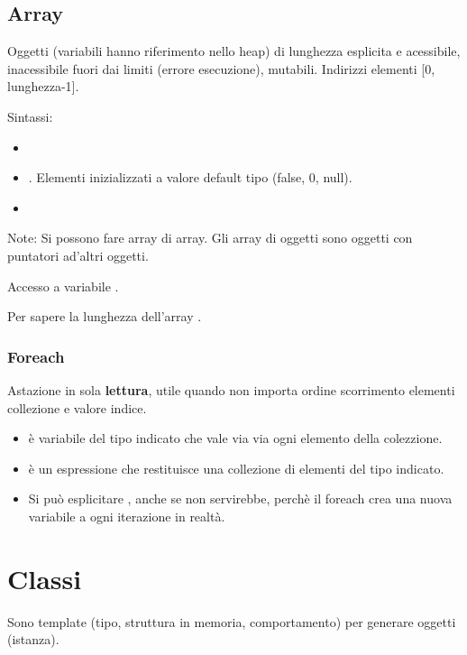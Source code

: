\subsection{Array}
Oggetti (variabili hanno riferimento nello heap) di lunghezza esplicita e acessibile, inacessibile fuori dai limiti (errore esecuzione), mutabili. Indirizzi elementi [0, lunghezza-1].

Sintassi:
\begin{itemize}
	\item {}
	\item {}. Elementi inizializzati a valore default tipo (false, 0, null).
	\item {}
\end{itemize}

Note: Si possono fare array di array. Gli array di oggetti sono oggetti con puntatori ad'altri oggetti.

Accesso a variabile .

Per sapere la lunghezza dell'array .

\subsubsection{Foreach}
Astazione  in sola \textbf{lettura}, utile quando non importa ordine scorrimento elementi collezione e valore indice.


\begin{itemize}
	\item {} è variabile del tipo indicato che vale via via ogni elemento della colezzione.
	\item {} è un espressione che restituisce una collezione di elementi del tipo indicato.
	\item Si può esplicitare , anche se non servirebbe, perchè il foreach crea una nuova variabile a ogni iterazione in realtà.
\end{itemize}






\section{Classi}
Sono template (tipo, struttura in memoria, comportamento) per generare oggetti (istanza).

